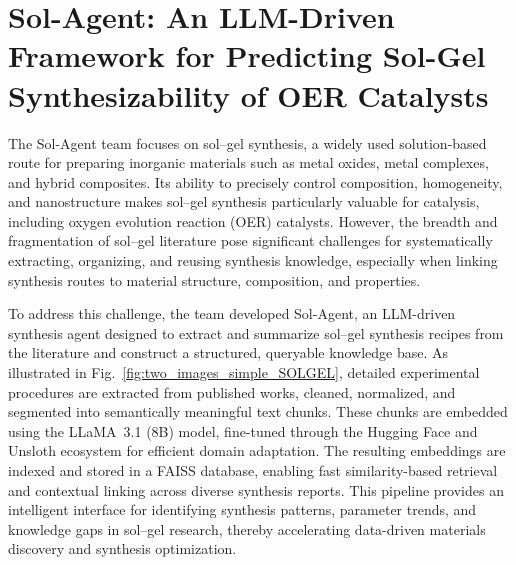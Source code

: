 

\section{Sol-Agent: An LLM-Driven Framework for Predicting Sol-Gel Synthesizability of OER Catalysts}


The Sol-Agent team focuses on sol--gel synthesis, a widely used solution-based route for preparing inorganic materials such as metal oxides, metal complexes, and hybrid composites. Its ability to precisely control composition, homogeneity, and nanostructure makes sol--gel synthesis particularly valuable for catalysis, including oxygen evolution reaction (OER) catalysts. However, the breadth and fragmentation of sol--gel literature pose significant challenges for systematically extracting, organizing, and reusing synthesis knowledge, especially when linking synthesis routes to material structure, composition, and properties.

To address this challenge, the team developed Sol-Agent, an LLM-driven synthesis agent designed to extract and summarize sol--gel synthesis recipes from the literature and construct a structured, queryable knowledge base. As illustrated in Fig.~\ref{fig:two_images_simple_SOLGEL}, detailed experimental procedures are extracted from published works, cleaned, normalized, and segmented into semantically meaningful text chunks. These chunks are embedded using the LLaMA~3.1 (8B) model, fine-tuned through the Hugging Face and Unsloth ecosystem for efficient domain adaptation. The resulting embeddings are indexed and stored in a FAISS database, enabling fast similarity-based retrieval and contextual linking across diverse synthesis reports. This pipeline provides an intelligent interface for identifying synthesis patterns, parameter trends, and knowledge gaps in sol--gel research, thereby accelerating data-driven materials discovery and synthesis optimization.

